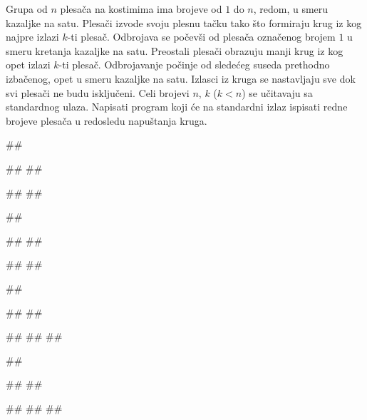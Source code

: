 \begin{Exercise}[label=612]
Grupa od $n$ plesača na kostimima ima brojeve od $1$ do $n$, redom, u smeru kazaljke na satu.
Plesači izvode svoju plesnu tačku tako što formiraju krug iz kog najpre izlazi $k$-ti plesač.
Odbrojava se počevši od plesača označenog brojem $1$ u smeru kretanja kazaljke na satu. 
Preostali plesači obrazuju manji krug iz kog opet izlazi $k$-ti plesač. Odbrojavanje počinje od
sledećeg suseda prethodno izbačenog, opet u smeru kazaljke na satu. Izlasci iz kruga se nastavljaju
sve dok svi plesači ne budu isključeni. 
Celi brojevi $n$, $k$ ($k < n$) se učitavaju sa standardnog ulaza. 
Napisati program koji će na standardni izlaz ispisati redne brojeve plesača u redosledu napuštanja kruga. 

\noindent
\begin{minitest}
\begin{test}{1}
##

#\naslovUlaz#
##

#\naslovIzlaz# 
##
\end{test}
\end{minitest}
\begin{minitest}
\begin{test}{2}
##

#\naslovUlaz#
##

#\naslovIzlaz# 
## 
\end{test}
\end{minitest}
\begin{minitest}
\begin{test}{3}
##

#\naslovUlaz#
##

#\naslovIzlaz# 
##
##
\end{test}
\end{minitest}
\begin{minitest}
\begin{test}{4}
##

#\naslovUlaz#
##

#\naslovIzlaz# 
##
##
\end{test}
\end{minitest}
\end{Exercise}

